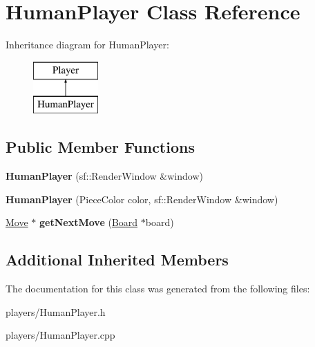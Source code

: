 \hypertarget{class_human_player}{}\section{Human\+Player Class Reference}
\label{class_human_player}
Inheritance diagram for Human\+Player\+:\begin{figure}[H]
\begin{center}
\leavevmode
\includegraphics[height=2.000000cm]{class_human_player}
\end{center}
\end{figure}
\subsection*{Public Member Functions}
\begin{DoxyCompactItemize}
\item 
\mbox{\label{class_human_player_a9126eadf60fc35c400d656610e288eda}} 
{\bfseries Human\+Player} (sf\+::\+Render\+Window \&window)
\item 
\mbox{\label{class_human_player_a36d914c4805583851031fc3d537d0cd5}} 
{\bfseries Human\+Player} (Piece\+Color color, sf\+::\+Render\+Window \&window)
\item 
\mbox{\label{class_human_player_abd281d6f332ccfeaf4e8f5b330a496f8}} 
\mbox{\hyperlink{class_move}{Move}} $\ast$ {\bfseries get\+Next\+Move} (\mbox{\hyperlink{class_board}{Board}} $\ast$board)
\end{DoxyCompactItemize}
\subsection*{Additional Inherited Members}


The documentation for this class was generated from the following files\+:\begin{DoxyCompactItemize}
\item 
players/Human\+Player.\+h\item 
players/Human\+Player.\+cpp\end{DoxyCompactItemize}
